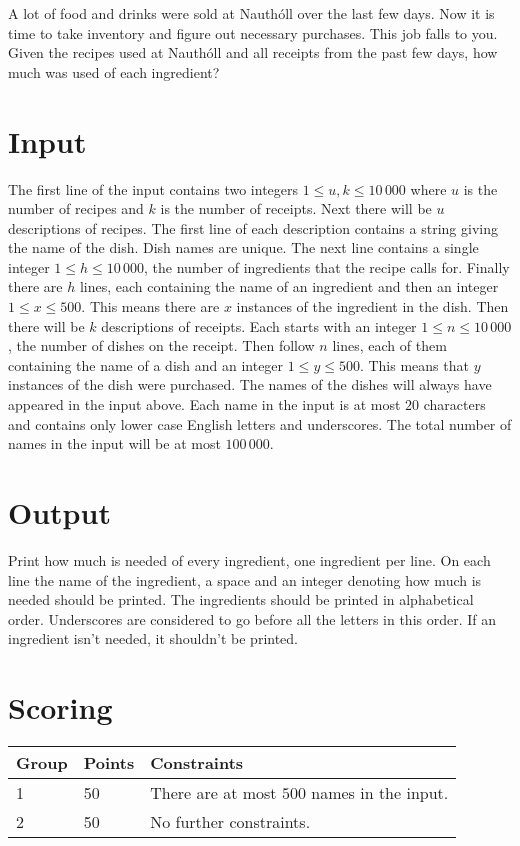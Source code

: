 
A lot of food and drinks were sold at Nauthóll over the last few days. Now it is time
to take inventory and figure out necessary purchases. This job falls to you.
Given the recipes used at Nauthóll and all receipts from the past few days, how much was
used of each ingredient?

\section*{Input}
The first line of the input contains two integers $1 \leq u, k \leq 10\,000$ where
$u$ is the number of recipes and $k$ is the number of receipts. Next there will be $u$
descriptions of recipes. The first line of each description contains a string giving the
name of the dish. Dish names are unique. The next line contains a single integer $1 \leq h \leq 10\,000$,
the number of ingredients that the recipe calls for. Finally there are $h$ lines, each containing the
name of an ingredient and then an integer $1 \leq x \leq 500$. This means there are $x$ instances of
the ingredient in the dish. Then there will be $k$ descriptions of receipts. Each starts with an integer
$1 \leq n \leq 10\,000$, the number of dishes on the receipt. Then follow $n$ lines, each of them containing
the name of a dish and an integer $1 \leq y \leq 500$. This means that $y$ instances of the dish were
purchased. The names of the dishes will always have appeared in the input above. Each name in the input
is at most $20$ characters and contains only lower case English letters and underscores. The total number
of names in the input will be at most $100\,000$.

\section*{Output}
Print how much is needed of every ingredient, one ingredient per line. On each line the name of the ingredient,
a space and an integer denoting how much is needed should be printed. The ingredients should be printed in
alphabetical order. Underscores are considered to go before all the letters in this order.
If an ingredient isn't needed, it shouldn't be printed.

\section*{Scoring}
\begin{tabular}{|l|l|l|}
\hline
Group & Points & Constraints \\ \hline
1     & 50   & There are at most $500$ names in the input. \\ \hline
2     & 50   & No further constraints. \\ \hline
\end{tabular}

